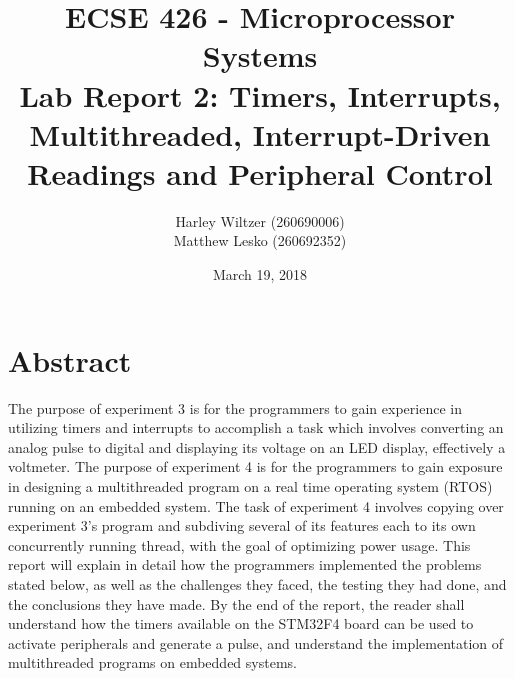 \documentclass[12pt]{report}
\title{ECSE 426 - Microprocessor Systems\\Lab Report 2: Timers, Interrupts, Multithreaded, Interrupt-Driven Readings and Peripheral Control}
\author{Harley Wiltzer (260690006)\\Matthew Lesko (260692352)}
\date{March 19, 2018}
\begin{document}
\maketitle
{}
\tableofcontents
\listoffigures
\let\clearpage\relax
\listoftables
\newpage
{}
\section{Abstract}
The purpose of experiment 3 is for the programmers to gain experience in utilizing timers and interrupts to accomplish a task which involves converting an analog pulse to digital and displaying its voltage on an LED display, effectively a voltmeter. The purpose of experiment 4 is for the programmers to gain exposure in designing a multithreaded program on a real time operating system (RTOS) running on an embedded system. The task of experiment 4 involves copying over experiment 3's program and subdiving several of its features each to its own concurrently running thread, with the goal of optimizing power usage. This report will explain in detail how the programmers implemented the problems stated below, as well as the challenges they faced, the testing they had done, and the conclusions they have made. By the end of the report, the reader shall understand how the timers available on the STM32F4 board can be used to activate peripherals and generate a pulse, and understand the implementation of multithreaded programs on embedded systems.
\end{document}
